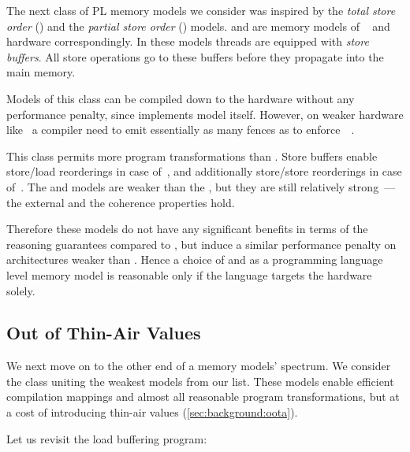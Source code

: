 The next class of PL memory models we consider 
was inspired by the \emph{total store order} (\TSO) 
and the \emph{partial store order} (\PSO) models. 
\TSO and \PSO are memory models of 
\Intel~\cite{Sewell-al:CACM10} and \SPARC~\cite{Sparc:94} 
hardware correspondingly.
In these models threads are equipped with \emph{store buffers}.
All store operations go to these buffers before they 
propagate into the main memory.

Models of this class can be compiled down to the \Intel hardware without any 
performance penalty, since \Intel implements \TSO model itself.
However, on weaker hardware like~\POWER 
a compiler need to emit essentially as many fences 
as to enforce~\SC~\cite{Lustig-al:AISCA15}. 

This class permits more program transformations than \SC.
Store buffers enable store/load reorderings in case of~\TSO,
and additionally store/store reorderings in case of~\PSO.
The \TSO and \PSO models are weaker than the \SC, 
but they are still relatively strong~---
the external \DRF and the coherence properties hold.

Therefore these models do not have any significant 
benefits in terms of the reasoning guarantees compared to \SC,
but induce a similar performance penalty 
on architectures weaker than \Intel. 
Hence a choice of \TSO and \PSO as a programming language level
memory model is reasonable only if the language targets
the \Intel hardware solely. 

\subsection{Out of Thin-Air Values}
\label{sec:analysis:oota}

We next move on to the other end of a memory models' spectrum. 
We consider the class uniting the weakest models from our list.
These models enable efficient compilation mappings and 
almost all reasonable program transformations, but at a cost of 
introducing thin-air values (\cref{sec:background:oota}).

Let us revisit the load buffering program:  

